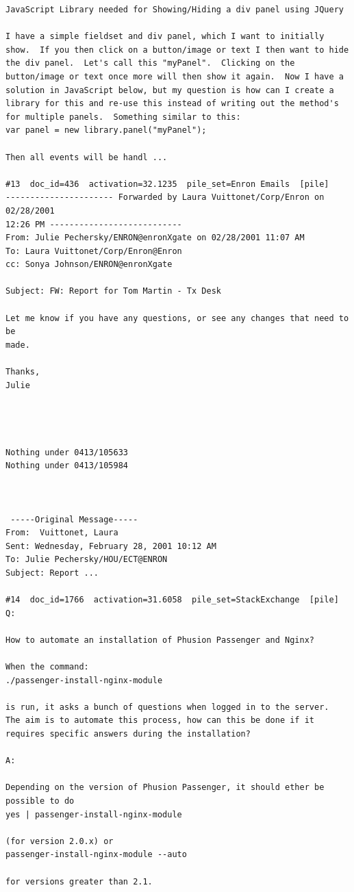 \begin{verbatim}
JavaScript Library needed for Showing/Hiding a div panel using JQuery

I have a simple fieldset and div panel, which I want to initially show.  If you then click on a button/image or text I then want to hide the div panel.  Let's call this "myPanel".  Clicking on the button/image or text once more will then show it again.  Now I have a solution in JavaScript below, but my question is how can I create a library for this and re-use this instead of writing out the method's for multiple panels.  Something similar to this:
var panel = new library.panel("myPanel");

Then all events will be handl ...

#13  doc_id=436  activation=32.1235  pile_set=Enron Emails  [pile]
---------------------- Forwarded by Laura Vuittonet/Corp/Enron on 02/28/2001 
12:26 PM ---------------------------
From: Julie Pechersky/ENRON@enronXgate on 02/28/2001 11:07 AM
To: Laura Vuittonet/Corp/Enron@Enron
cc: Sonya Johnson/ENRON@enronXgate 

Subject: FW: Report for Tom Martin - Tx Desk

Let me know if you have any questions, or see any changes that need to be 
made.

Thanks,
Julie




Nothing under 0413/105633
Nothing under 0413/105984



 -----Original Message-----
From:  Vuittonet, Laura  
Sent: Wednesday, February 28, 2001 10:12 AM
To: Julie Pechersky/HOU/ECT@ENRON
Subject: Report ...

#14  doc_id=1766  activation=31.6058  pile_set=StackExchange  [pile]
Q:

How to automate an installation of Phusion Passenger and Nginx?

When the command:
./passenger-install-nginx-module

is run, it asks a bunch of questions when logged in to the server.
The aim is to automate this process, how can this be done if it requires specific answers during the installation?

A:

Depending on the version of Phusion Passenger, it should ether be possible to do
yes | passenger-install-nginx-module

(for version 2.0.x) or
passenger-install-nginx-module --auto

for versions greater than 2.1.




\end{verbatim}
